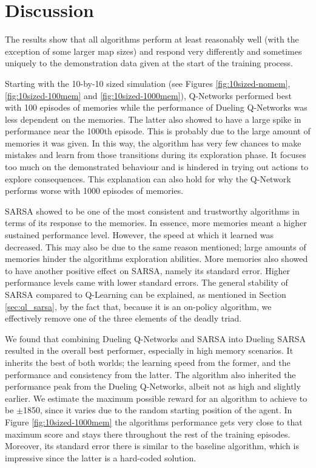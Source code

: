 
\section{Discussion}\label{sec:discussion}
The results show that all algorithms perform at least reasonably well (with the exception of some larger map sizes) and respond very differently and sometimes uniquely to the demonstration data given at the start of the training process. 

Starting with the 10-by-10 sized simulation (see Figures \ref{fig:10sized-nomem}, \ref{fig:10sized-100mem} and \ref{fig:10sized-1000mem}), Q-Networks performed best with 100 episodes of memories while the performance of Dueling Q-Networks was less dependent on the memories. The latter also showed to have a large spike in performance near the 1000th episode. This is probably due to the large amount of memories it was given. In this way, the algorithm has very few chances to make mistakes and learn from those transitions during its exploration phase. It focuses too much on the demonstrated behaviour and is hindered in trying out actions to explore consequences. This explanation can also hold for why the Q-Network performs worse with 1000 episodes of memories.


SARSA showed to be one of the most consistent and trustworthy algorithms in terms of its response to the memories. In essence, more memories meant a higher sustained performance level. However, the speed at which it learned was decreased. This may also be due to the same reason mentioned; large amounts of memories hinder the algorithms exploration abilities. More memories also showed to have another positive effect on SARSA, namely its standard error. Higher performance levels came with lower standard errors. The general stability of SARSA compared to Q-Learning can be explained, as mentioned in Section \ref{sec:ql_sarsa}, by the fact that, because it is an on-policy algorithm, we effectively remove one of the three elements of the deadly triad. 

We found that combining Dueling Q-Networks and SARSA into Dueling SARSA resulted in the overall best performer, especially in high memory scenarios. It inherits the best of both worlds; the learning speed from the former, and the performance and consistency from the latter. The algorithm also inherited the performance peak from the Dueling Q-Networks, albeit not as high and slightly earlier. We estimate the maximum possible reward for an algorithm to achieve to be $\pm$1850, since it varies due to the random starting position of the agent. In Figure \ref{fig:10sized-1000mem} the algorithms performance gets very close to that maximum score and stays there throughout the rest of the training episodes. Moreover, its standard error there is similar to the baseline algorithm, which is impressive since the latter is a hard-coded solution.


